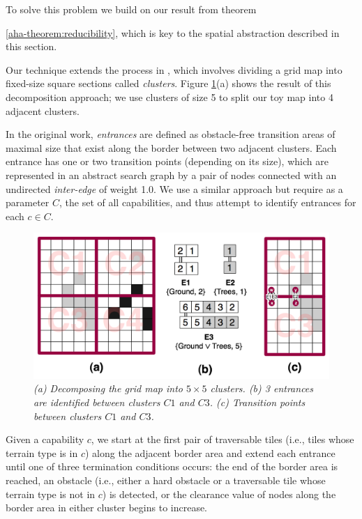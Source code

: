 To solve this problem we build on our result from theorem {\ref{aha-theorem:reducibility}, which is key to the spatial abstraction described in this section.
\par \indent
Our technique extends the process in \cite{botea04}, which involves dividing a grid map into fixed-size square sections called \emph{clusters}. 
Figure \ref{aha-fig:clustersandentrances}(a) shows the result of this decomposition approach; we use clusters of size 5 to split our toy map into 4 adjacent clusters. 
\par \indent
In the original work, \emph{entrances} are defined as obstacle-free transition areas of maximal size that exist along the border between two adjacent clusters.
Each entrance has one or two transition points (depending on its size), which are represented in an abstract search graph by a pair of nodes connected with an undirected \emph{inter-edge} of weight 1.0. 
We use a similar approach but require as a parameter $C$, the set of all capabilities, and thus attempt to identify entrances for each $c \in C$. 
\begin{figure}[htbp]
	\vspace{-9pt}
        \caption{\emph{(a) Decomposing the grid map into $5 \times 5$ clusters. (b) 3 entrances are identified between clusters $C1$ and $C3$. (c) Transition points between clusters $C1$ and $C3$.} \vspace{0.5em} }
        \begin{center}
                        \includegraphics[scale=0.30, trim = 20mm 0mm 20mm 0mm]{diagrams/identifying_entrances.png}
        \end{center}
        \label{aha-fig:clustersandentrances}
	\vspace{-9pt}
\end{figure}
\par \indent
Given a capability $c$,
we start at the first pair of traversable tiles (i.e., tiles whose terrain type is in $c$) along the adjacent border area and extend each entrance until one of three termination conditions occurs: the end of the border area is reached, an obstacle (i.e., either a hard obstacle or a traversable tile whose terrain type is not in $c$) is detected, or the clearance value of nodes along the border area in either cluster begins to increase. 
}
